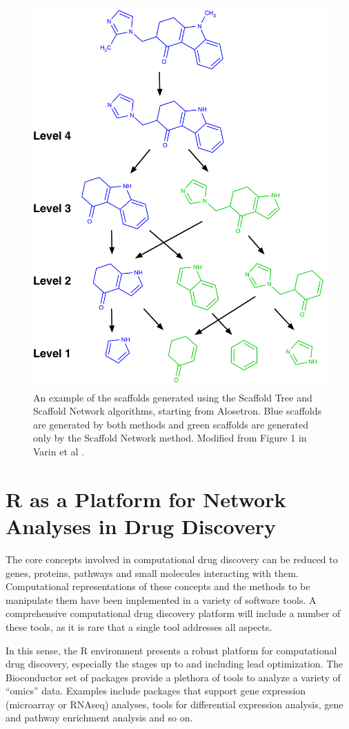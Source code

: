 \documentclass[]{book}
\begin{document}
\begin{figure}[h]
  \centering
  \includegraphics[width=0.75\linewidth]{img/scaffold-network}
  \caption{An example of the scaffolds generated using
  the Scaffold Tree and Scaffold Network algorithms, starting from
  Alosetron. Blue scaffolds are generated by both methods and green
  scaffolds are generated only by the Scaffold Network
  method. Modified from Figure 1 in Varin et al \cite{Varin:2011ve}.}
  \label{fig:scaffnet}
\end{figure}

\section{R as a Platform for Network Analyses in Drug Discovery}
\label{sec:r-as-platform}

The core concepts involved in computational drug discovery can be
reduced to genes, proteins, pathways and small molecules interacting
with them. Computational representations of these concepts and the
methods to be manipulate them have been implemented in a variety of
software tools. A comprehensive computational drug discovery platform
will include a number of these tools, as it is rare that a single tool
addresses all aspects.

In this sense, the R environment presents a robust platform for
computational drug discovery, especially the stages up to and
including lead optimization. The Bioconductor set of packages provide
a plethora of tools to analyze a variety of ``omics'' data. Examples
include packages that support gene expression (microarray or RNAseq)
analyses, tools for differential expression analysis, gene and pathway
enrichment analysis and so on. 
\end{document}
